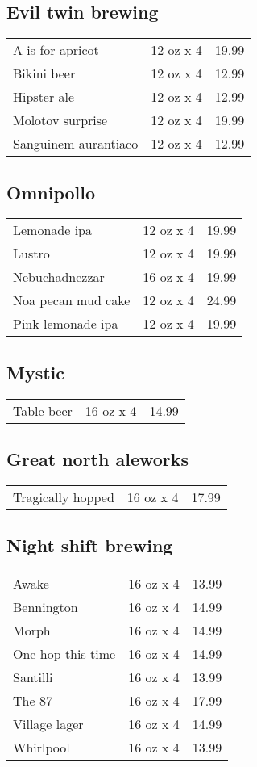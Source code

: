 \documentclass{article}%
\begin{document}
\begin{multicols}{3}
%
\subsection*{Evil twin brewing}%
\begin{tabular}{l c r}%
A is for apricot&12 oz x 4&19.99\\%
Bikini beer&12 oz x 4&12.99\\%
Hipster ale&12 oz x 4&12.99\\%
Molotov surprise&12 oz x 4&19.99\\%
Sanguinem aurantiaco&12 oz x 4&12.99\\%
\end{tabular}

%
\subsection*{Omnipollo}%
\begin{tabular}{l c r}%
Lemonade ipa&12 oz x 4&19.99\\%
Lustro&12 oz x 4&19.99\\%
Nebuchadnezzar&16 oz x 4&19.99\\%
Noa pecan mud cake&12 oz x 4&24.99\\%
Pink lemonade ipa&12 oz x 4&19.99\\%
\end{tabular}

%
\subsection*{Mystic}%
\begin{tabular}{l c r}%
Table beer&16 oz x 4&14.99\\%
\end{tabular}

%
\subsection*{Great north aleworks}%
\begin{tabular}{l c r}%
Tragically hopped&16 oz x 4&17.99\\%
\end{tabular}

%
\subsection*{Night shift brewing}%
\begin{tabular}{l c r}%
Awake&16 oz x 4&13.99\\%
Bennington&16 oz x 4&14.99\\%
Morph&16 oz x 4&14.99\\%
One hop this time&16 oz x 4&14.99\\%
Santilli&16 oz x 4&13.99\\%
The 87&16 oz x 4&17.99\\%
Village lager&16 oz x 4&14.99\\%
Whirlpool&16 oz x 4&13.99\\%
\end{tabular}


\end{multicols}
\end{document}
